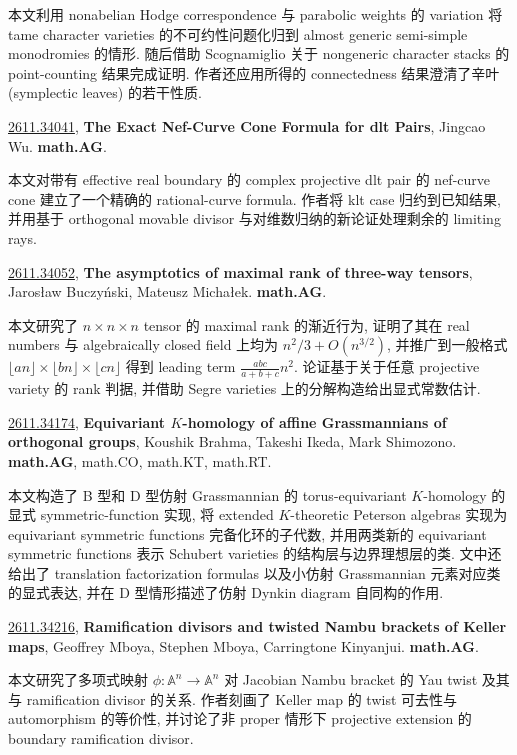 \documentclass[9pt, a4paper]{article}
\theoremstyle{plain}
\theoremstyle{definition}
\theoremstyle{remark}
\newcommand{\arxivwithtarget}[3]{\hypertarget{#1}{}\href{https://arxiv.org/abs/#1}{#1}, \textbf{\textcolor{arxivblue}{#2}}, #3. }
\begin{document}
本文利用 nonabelian Hodge correspondence 与 parabolic weights 的 variation 将 tame character varieties 的不可约性问题化归到 almost generic semi-simple monodromies 的情形. 随后借助 Scognamiglio 关于 nongeneric character stacks 的 point-counting 结果完成证明. 作者还应用所得的 connectedness 结果澄清了辛叶 (symplectic leaves) 的若干性质.


\arxivwithtarget{2611.34041}{The Exact Nef-Curve Cone Formula for dlt Pairs}{Jingcao Wu}\textbf{math.AG}.

本文对带有 effective real boundary 的 complex projective dlt pair 的 nef-curve cone 建立了一个精确的 rational-curve formula. 作者将 klt case 归约到已知结果, 并用基于 orthogonal movable divisor 与对维数归纳的新论证处理剩余的 limiting rays.


\arxivwithtarget{2611.34052}{The asymptotics of maximal rank of three-way tensors}{Jarosław Buczy{ń}ski, Mateusz Michałek}\textbf{math.AG}.

本文研究了 $n\times n\times n$ tensor 的 maximal rank 的渐近行为, 证明了其在 real numbers 与 algebraically closed field 上均为 $n^2/3+O(n^{3/2})$, 并推广到一般格式 $\lfloor an\rfloor\times\lfloor bn\rfloor\times\lfloor cn\rfloor$ 得到 leading term $\frac{abc}{a+b+c}n^2$. 论证基于关于任意 projective variety 的 rank 判据, 并借助 Segre varieties 上的分解构造给出显式常数估计.


\arxivwithtarget{2611.34174}{Equivariant $K$-homology of affine Grassmannians of orthogonal groups}{Koushik Brahma, Takeshi Ikeda, Mark Shimozono}\textbf{math.AG}, math.CO, math.KT, math.RT.

本文构造了 B 型和 D 型仿射 Grassmannian 的 torus-equivariant \(K\)-homology 的显式 symmetric-function 实现, 将 extended \(K\)-theoretic Peterson algebras 实现为 equivariant symmetric functions 完备化环的子代数, 并用两类新的 equivariant symmetric functions 表示 Schubert varieties 的结构层与边界理想层的类. 文中还给出了 translation factorization formulas 以及小仿射 Grassmannian 元素对应类的显式表达, 并在 D 型情形描述了仿射 Dynkin diagram 自同构的作用.


\arxivwithtarget{2611.34216}{Ramification divisors and twisted Nambu brackets of Keller maps}{Geoffrey Mboya, Stephen Mboya, Carringtone Kinyanjui}\textbf{math.AG}.

本文研究了多项式映射 $\phi\colon\mathbb{A}^n\to\mathbb{A}^n$ 对 Jacobian Nambu bracket 的 Yau twist 及其与 ramification divisor 的关系. 作者刻画了 Keller map 的 twist 可去性与 automorphism 的等价性, 并讨论了非 proper 情形下 projective extension 的 boundary ramification divisor.
\end{document}
